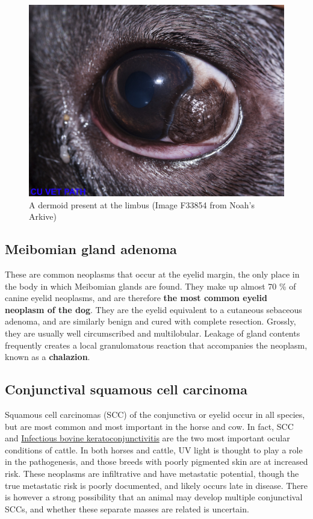 \documentclass[openany]{article}
\begin{document}
\begin{figure}

{\centering \includegraphics{images/dermoid_F33854} 

}

\caption{A dermoid present at the limbus (Image F33854 from Noah's Arkive)}\label{fig:dermoid}
\end{figure}

\subsection{Meibomian gland adenoma}\label{meibomian-gland-adenoma}

These are common neoplasms that occur at the eyelid margin, the only
place in the body in which Meibomian glands are found. They make up
almost 70 \% of canine eyelid neoplasms, and are therefore \textbf{the
most common eyelid neoplasm of the dog}. They are the eyelid equivalent
to a cutaneous sebaceous adenoma, and are similarly benign and cured
with complete resection. Grossly, they are usually well circumscribed
and multilobular. Leakage of gland contents frequently creates a local
granulomatous reaction that accompanies the neoplasm, known as a
\textbf{chalazion}.

\hypertarget{conjunctival-squamous-cell-carcinoma}{\subsection{Conjunctival
squamous cell carcinoma}\label{conjunctival-squamous-cell-carcinoma}}

Squamous cell carcinomas (SCC) of the conjunctiva or eyelid occur in all
species, but are most common and most important in the horse and cow. In
fact, SCC and
\protect\hyperlink{infectious-bovine-keratoconjunctivitis}{Infectious
bovine keratoconjunctivitis} are the two most important ocular
conditions of cattle. In both horses and cattle, UV light is thought to
play a role in the pathogenesis, and those breeds with poorly pigmented
skin are at increased risk. These neoplasms are infiltrative and have
metastatic potential, though the true metastatic risk is poorly
documented, and likely occurs late in disease. There is however a strong
possibility that an animal may develop multiple conjunctival SCCs, and
whether these separate masses are related is uncertain.
\end{document}
